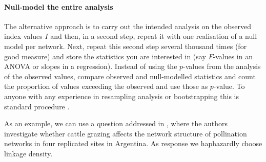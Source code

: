 \documentclass[a4paper, 11pt]{article}\usepackage[]{graphicx}\usepackage[]{color}
\newcommand{\ind}[1]{#1\index{#1}}           			   %
\begin{document}
\paragraph{Null-model the entire analysis}
The alternative approach is to carry out the intended analysis on the observed index values $I$ and then, in a second step, repeat it with one realisation of a null model per network. Next, repeat this second step several thousand times (for good measure) and store the statistics you are interested in (say $F$-values in an ANOVA or slopes in a regression). Instead of using the $p$-values from the analysis of the observed values, compare observed and null-modelled statistics and count the proportion of values exceeding the observed and use those as $p$-value. To anyone with any experience in \ind{resampling analysis} or bootstrapping this is standard procedure \citep{Efron1993,Manly1997}.

As an example, we can use a question addressed in \citet{Vazquez2003}, where the authors investigate whether cattle grazing affects the network structure of pollination networks in four replicated sites in Argentina. As response we haphazardly choose linkage density. %
\end{document}
